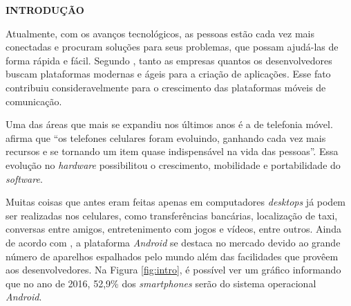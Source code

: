   \vspace{1.2em}
  \textbf{\large INTRODUÇÃO}
  \vspace{2.9em}
\thispagestyle{empty}


	\par Atualmente, com os avanços tecnológicos, as pessoas estão cada vez mais
conectadas e procuram soluções para seus problemas, que possam ajudá-las de
forma rápida e fácil.  Segundo , tanto as empresas
quantos os desenvolvedores buscam plataformas modernas e ágeis para a criação
de aplicações. Esse fato contribuiu consideravelmente para o crescimento das
plataformas móveis de comunicação.

	\par Uma das áreas que mais se expandiu nos últimos anos é a de telefonia
móvel.  afirma que “os telefones celulares foram
evoluindo, ganhando cada vez mais recursos e se tornando um item quase
indispensável na vida das pessoas”. Essa evolução no \textit{hardware}
possibilitou o crescimento, mobilidade e portabilidade do \textit{software}.

	\par Muitas coisas que antes eram feitas apenas em computadores
\textit{desktops} já podem ser realizadas nos celulares, como transferências
bancárias, localização de taxi, conversas entre amigos, entretenimento com
jogos e vídeos, entre outros. Ainda de acordo com , a
plataforma \textit{Android} se destaca no mercado devido ao grande número de
aparelhos espalhados pelo mundo além das facilidades que provêem aos
desenvolvedores. Na Figura \ref{fig:intro}, é possível ver um gráfico
informando que no ano de 2016, 52,9\% dos \textit{smartphones} serão do sistema
operacional \textit{Android}.

